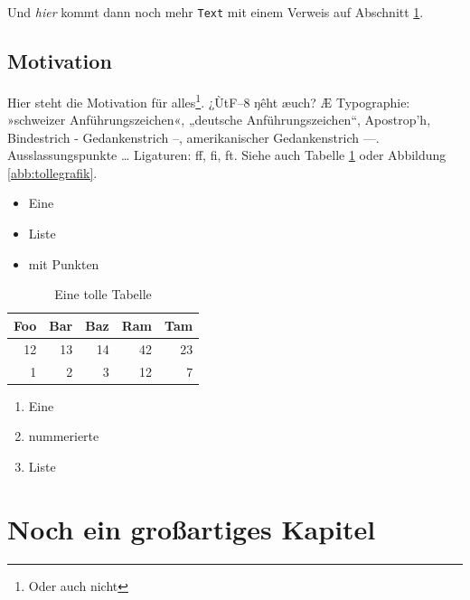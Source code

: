 \documentclass[
parskip=true,  %
fontsize=12pt, %
BCOR=12mm,     %
twoside=false  %
]{scrreprt}
\begin{document}
\blindtext

Und \emph{hier} kommt dann noch mehr \texttt{Text} mit einem Verweis auf
Abschnitt \ref{sec:motivation}.

\section{Motivation}
\label{sec:motivation} %

Hier steht die Motivation für alles\footnote{Oder auch nicht\cite{wiki:latex}}.
¿ÙtF–8 ŋêht æuch? Æ Typographie: »schweizer Anführungszeichen«, „deutsche
Anführungszeichen“, Apostrop’h, Bindestrich - Gedankenstrich –, amerikanischer
Gedankenstrich —.  Ausslassungspunkte … Ligaturen: ff, fi, ft. Siehe auch
Tabelle \ref{tab:tolletab} oder Abbildung \ref{abb:tollegrafik}.

\blindtext

\begin{itemize}
\item Eine
\item Liste
\item mit Punkten

\end{itemize}

\blindtext

\begin{table}[ht]
    \centering
    \begin{tabular}{rrrrr}
        \toprule
        Foo & Bar & Baz & Ram & Tam\\
        \midrule
        12 & 13 & 14 & 42 & 23\\
        \midrule
        1  & 2  &  3 & 12 &  7\\
        \bottomrule
    \end{tabular}
    \caption{Eine tolle Tabelle}
    \label{tab:tolletab}
\end{table}


\blindtext\blindtext

\begin{enumerate}
\item Eine
\item nummerierte
\item Liste
\end{enumerate}

\blindtext

\chapter{Noch ein großartiges Kapitel}
\end{document}
